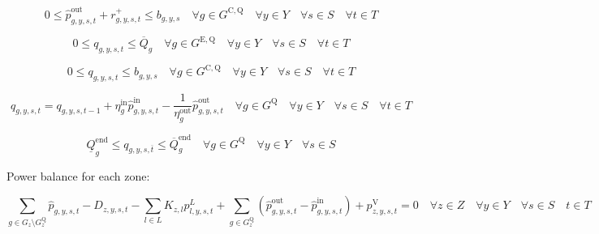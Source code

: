 \documentclass{article}
\newcommand{\sGenerators}{G}
\newcommand{\sStorage}{G^{\mathrm{Q}}}
\newcommand{\sStorageExisting}{G^{\mathrm{E,Q}}}
\newcommand{\sStorageCandidate}{G^{\mathrm{C,Q}}}
\newcommand{\sYears}{Y}
\newcommand{\sScenarios}{S}
\newcommand{\sIntervals}{T}
\newcommand{\sZones}{Z}
\newcommand{\sLinks}{L}
\newcommand{\iGenerator}{g}
\newcommand{\iYear}{y}
\newcommand{\iScenario}{s}
\newcommand{\iInterval}{t}
\newcommand{\iIntervalTerminal}{\overline{\iInterval}}
\newcommand{\iZone}{z}
\newcommand{\iLink}{l}
\newcommand{\cStorageUnitEnergyMax}[1][\iGenerator]{\overline{Q}_{#1}}
\newcommand{\cStorageUnitEnergyIntervalEndMax}[1][\iGenerator]{\overline{Q}^{\mathrm{end}}_{#1}}
\newcommand{\cStorageUnitEnergyIntervalEndMin}[1][\iGenerator]{\underline{Q}^{\mathrm{end}}_{#1}}
\newcommand{\cStorageUnitEfficiencyCharging}{\eta_{\iGenerator}^{\mathrm{in}}}
\newcommand{\cStorageUnitEfficiencyDischarging}{\eta_{\iGenerator}^{\mathrm{out}}}
\newcommand{\cDemand}[1][\iZone,\iYear,\iScenario,\iInterval]{D_{#1}}
\newcommand{\cIncidenceMatrix}[1][\iZone,\iLink]{K_{#1}}
\newcommand{\vReserveUp}[1][\iGenerator,\iYear,\iScenario,\iInterval]{r^{+}_{#1}}
\newcommand{\vPowerTotal}[1][\iGenerator,\iYear,\iScenario,\iInterval]{\hat{p}_{#1}}
\newcommand{\vPowerTotalIn}[1][\iGenerator,\iYear,\iScenario,\iInterval]{\hat{p}^{\mathrm{in}}_{#1}}
\newcommand{\vPowerTotalOut}[1][\iGenerator,\iYear,\iScenario,\iInterval]{\hat{p}^{\mathrm{out}}_{#1}}
\newcommand{\vStorageUnitEnergy}[1][\iGenerator,\iYear,\iScenario,\iInterval]{q_{#1}}
\newcommand{\vPowerFlow}[1][\iLink,\iYear,\iScenario,\iInterval]{p^{\sLinks}_{#1}}
\newcommand{\vLostLoadPower}[1][\iZone,\iYear,\iScenario,\iInterval]{p^{\mathrm{V}}_{#1}}
\newcommand{\vInstalledCapacityTotalScenario}[1][\iGenerator,\iYear,\iScenario]{b_{#1}}
\begin{document}
\begin{equation}
0 \leq \vPowerTotalOut + \vReserveUp \leq \vInstalledCapacityTotalScenario \quad \forall \iGenerator \in \sStorageCandidate \quad \forall \iYear \in \sYears \quad \forall \iScenario \in \sScenarios \quad \forall \iInterval \in \sIntervals
\end{equation}

\begin{equation}
0 \leq \vStorageUnitEnergy \leq \cStorageUnitEnergyMax \quad \forall \iGenerator \in \sStorageExisting \quad \forall \iYear \in \sYears \quad \forall \iScenario \in \sScenarios \quad \forall \iInterval \in \sIntervals
\end{equation}

\begin{equation}
0 \leq \vStorageUnitEnergy \leq \vInstalledCapacityTotalScenario \quad \forall \iGenerator \in \sStorageCandidate \quad \forall \iYear \in \sYears \quad \forall \iScenario \in \sScenarios \quad \forall \iInterval \in \sIntervals
\end{equation}

\begin{equation}
\vStorageUnitEnergy = \vStorageUnitEnergy[\iGenerator,\iYear,\iScenario,\iInterval-1] + \cStorageUnitEfficiencyCharging \vPowerTotalIn - \frac{1}{\cStorageUnitEfficiencyDischarging} \vPowerTotalOut \quad \forall \iGenerator \in \sStorage \quad \forall \iYear \in \sYears \quad \forall \iScenario \in \sScenarios \quad \forall \iInterval \in \sIntervals
\end{equation}


\begin{equation}
\cStorageUnitEnergyIntervalEndMin \leq \vStorageUnitEnergy[\iGenerator,\iYear,\iScenario,\iIntervalTerminal] \leq \cStorageUnitEnergyIntervalEndMax \quad \forall \iGenerator \in \sStorage \quad \forall \iYear \in \sYears \quad \forall \iScenario \in \sScenarios
\end{equation}

Power balance for each zone:

\begin{equation}
\sum\limits_{\iGenerator \in \sGenerators_{\iZone} \setminus \sStorage_{\iZone}} \vPowerTotal - \cDemand - \sum\limits_{\iLink \in \sLinks} \cIncidenceMatrix \vPowerFlow + \sum\limits_{\iGenerator \in \sStorage_{\iZone}} \left(\vPowerTotalOut - \vPowerTotalIn\right) + \vLostLoadPower = 0 \quad \forall \iZone \in \sZones \quad \forall \iYear \in \sYears \quad \forall \iScenario \in \sScenarios \quad \iInterval \in \sIntervals
\end{equation}
\end{document}

